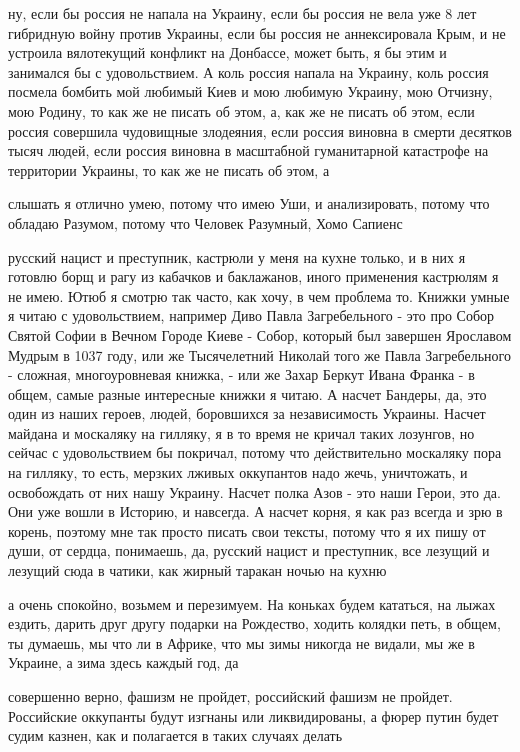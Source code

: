 ну, если бы россия не напала на Украину, если бы россия не вела уже 8 лет
гибридную войну против Украины, если бы россия не аннексировала Крым, и не
устроила вялотекущий конфликт на Донбассе, может быть, я бы этим и занимался бы
с удовольствием. А коль россия напала на Украину, коль россия посмела бомбить
мой любимый Киев и мою любимую Украину, мою Отчизну, мою Родину, то как же не
писать об этом, а, как же не писать об этом, если россия совершила чудовищные
злодеяния, если россия виновна в смерти десятков тысяч людей, если россия
виновна в масштабной гуманитарной катастрофе на территории Украины, то как же
не писать об этом, а

слышать я отлично умею, потому что имею Уши, и анализировать, потому что
обладаю Разумом, потому что Человек Разумный, Хомо Сапиенс

русский нацист и преступник, кастрюли у меня на кухне только, и в них я готовлю
борщ и рагу из кабачков и баклажанов, иного применения кастрюлям я не имею.
Ютюб я смотрю так часто, как хочу, в чем проблема то. Книжки умные я читаю с
удовольствием, например Диво Павла Загребельного - это про Собор Святой Софии в
Вечном Городе Киеве - Собор, который был завершен Ярославом Мудрым в 1037 году,
или же Тысячелетний Николай того же Павла Загребельного - сложная,
многоуровневая книжка, - или же Захар Беркут Ивана Франка - в общем, самые
разные интересные книжки я читаю. А насчет Бандеры, да, это один из наших
героев, людей, боровшихся за независимость Украины. Насчет майдана и москаляку
на гилляку, я в то время не кричал таких лозунгов, но сейчас с удовольствием бы
покричал, потому что действительно москаляку пора на гилляку, то есть, мерзких
лживых оккупантов надо жечь, уничтожать, и освобождать от них нашу Украину.
Насчет полка Азов - это наши Герои, это да. Они уже вошли в Историю, и
навсегда. А насчет корня, я как раз всегда и зрю в корень, поэтому мне так
просто писать свои тексты, потому что я их пишу от души, от сердца, понимаешь,
да, русский нацист и преступник, все лезущий и лезущий сюда в чатики, как
жирный таракан ночью на кухню

а очень спокойно, возьмем и перезимуем. На коньках будем кататься, на лыжах
ездить, дарить друг другу подарки на Рождество, ходить колядки петь, в общем,
ты думаешь, мы что ли в Африке, что мы зимы никогда не видали, мы же в Украине,
а зима здесь каждый год, да

совершенно верно, фашизм не пройдет, российский фашизм не пройдет. Российские
оккупанты будут изгнаны или ликвидированы, а фюрер путин будет судим казнен,
как и полагается в таких случаях делать

